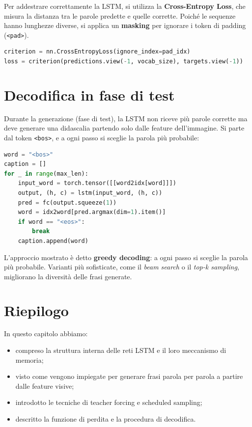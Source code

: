 \documentclass[11pt,a4paper]{report}
\newcommand{\bos}{\texttt{<bos>}}
\newcommand{\pad}{\texttt{<pad>}}
\begin{document}
Per addestrare correttamente la LSTM, si utilizza la \textbf{Cross-Entropy Loss}, che misura la distanza tra le parole predette e quelle corrette.  
Poiché le sequenze hanno lunghezze diverse, si applica un \textbf{masking} per ignorare i token di padding (\pad{}).

\begin{lstlisting}[language=Python, caption={Calcolo della loss con mascheramento.}]
criterion = nn.CrossEntropyLoss(ignore_index=pad_idx)
loss = criterion(predictions.view(-1, vocab_size), targets.view(-1))
\end{lstlisting}

\section{Decodifica in fase di test}

Durante la generazione (fase di test), la LSTM non riceve più parole corrette ma deve generare una didascalia partendo solo dalle feature dell’immagine.  
Si parte dal token \bos{}, e a ogni passo si sceglie la parola più probabile:

\begin{lstlisting}[language=Python, caption={Decodifica greedy.}]
word = "<bos>"
caption = []
for _ in range(max_len):
    input_word = torch.tensor([[word2idx[word]]])
    output, (h, c) = lstm(input_word, (h, c))
    pred = fc(output.squeeze(1))
    word = idx2word[pred.argmax(dim=1).item()]
    if word == "<eos>":
        break
    caption.append(word)
\end{lstlisting}

\begin{tcolorbox}[title=Nota]
L’approccio mostrato è detto \textbf{greedy decoding}: a ogni passo si sceglie la parola più probabile.  
Varianti più sofisticate, come il \emph{beam search} o il \emph{top-k sampling}, migliorano la diversità delle frasi generate.
\end{tcolorbox}

\section{Riepilogo}

In questo capitolo abbiamo:
\begin{itemize}
  \item compreso la struttura interna delle reti LSTM e il loro meccanismo di memoria;
  \item visto come vengono impiegate per generare frasi parola per parola a partire dalle feature visive;
  \item introdotto le tecniche di teacher forcing e scheduled sampling;
  \item descritto la funzione di perdita e la procedura di decodifica.
\end{itemize}
\end{document}
